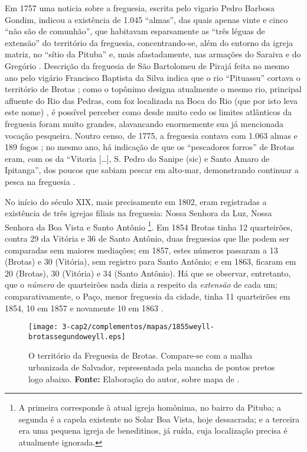 Em 1757 uma noticia sobre a freguesia, escrita pelo vigario Pedro Barbosa Gondim, indicou a existência de 1.045 ``almas'', das quais apenas vinte e cinco ``não são de comunhão'', que habitavam esparsamente as ``três léguas de extensão'' do território da freguesia, concentrando-se, além do entorno da igreja matriz, no ``sítio da Pituba'' e, mais afastadamente, nas armações do Saraiva e do Gregório \cite[p.~183]{castralmeida_ultramar_1908}. Descrição da freguesia de São Bartolomeu de Pirajá feita no mesmo ano pelo vigário Francisco Baptista da Silva indica que o rio ``Pituassu'' cortava o território de Brotas \cite[p.~218]{castralmeida_ultramar_1908}; como o topônimo designa atualmente o mesmo rio, principal afluente do Rio das Pedras, com foz localizada na Boca do Rio (que por isto leva este nome) \cite[p.~175-177]{santos_aguas_2010}, é possível perceber como desde muito cedo os limites atlânticos da freguesia foram muito grandes, alavancando enormemente sua já mencionada vocação pesqueira. Noutro censo, de 1775, a freguesia contava com 1.063 almas e 189 fogos \cite[p.~183]{castralmeida_ultramar_1910}; no mesmo ano, há indicação de que os ``pescadores forros'' de Brotas eram, com os da ``Vitoria [\dots], S. Pedro do Sanipe (sic) e Santo Amaro de Ipitanga'', dos poucos que sabiam pescar em alto-mar, demonstrando continuar a pesca na freguesia \cite[p.~294]{castralmeida_ultramar_1910}.

No início do século XIX, mais precisamente em 1802, eram registradas a existência de três igrejas filiais na freguesia: Nossa Senhora da Luz, Nossa Senhora da Boa Vista e Santo Antônio \cite[p.~172]{VASCONCELOS2002}\footnote{A primeira corresponde à atual igreja homônima, no bairro da Pituba; a segunda é a capela existente no Solar Boa Vista, hoje dessacrada; e a terceira era uma pequena igreja de beneditinos, já ruída, cuja localização precisa é atualmente ignorada.}. Em 1854 Brotas tinha 12 quarteirões, contra 29 da Vitória e 36 de Santo Antônio, duas freguesias que lhe podem ser comparadas sem maiores mediações; em 1857, estes números passaram a 13 (Brotas) e 30 (Vitória), sem registro para Santo Antônio; e em 1863, ficaram em 20 (Brotas), 30 (Vitória) e 34 (Santo Antônio). Há que se observar, entretanto, que o \textit{número} de quarteirões nada dizia a respeito da \textit{extensão} de cada um; comparativamente, o Paço, menor freguesia da cidade, tinha 11 quarteirões em 1854, 10 em 1857 e novamente 10 em 1863 \cite[p.~46]{NASCIMENTO2007}.

\begin{figure}[!htp]
\centering
\texttt{[image: 3-cap2/complementos/mapas/1855weyll-brotassegundoweyll.eps]} 
\caption{O território da Freguesia de Brotas. Compare-se com a malha urbanizada de Salvador, representada pela mancha de pontos pretos logo abaixo. \textbf{Fonte:} Elaboração do autor, sobre mapa de .}
\end{figure}

